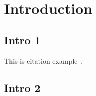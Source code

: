%

\section{Introduction}\label{sec:2_1}
\subsection{Intro 1}\label{subsec:2_1_1}
This is citation example~\cite{Einstein1905SR}.
\lipsum[10]


\subsection{Intro 2}\label{subsec:2_1_2}

\lipsum[10]

